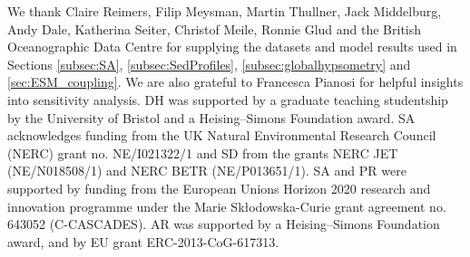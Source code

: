 \documentclass[gmd, manuscript]{copernicus}
\begin{document}




\begin{acknowledgements}
We thank Claire Reimers, Filip Meysman, Martin Thullner, Jack Middelburg, Andy Dale, Katherina Seiter, Christof Meile, Ronnie Glud and the British Oceanographic Data Centre for supplying the datasets and model results used in 
Sections \ref{subsec:SA}, \ref{subsec:SedProfiles},  \ref{subsec:globalhypsometry} and \ref{sec:ESM_coupling}. 
We are also grateful to Francesca Pianosi for helpful insights into sensitivity analysis. 
DH was supported by a graduate teaching studentship by the University of Bristol and a Heising–Simons Foundation award. SA acknowledges funding from the UK Natural Environmental Research Council (NERC) grant no. NE/I021322/1 and 
SD from the grants NERC JET (NE/N018508/1) and NERC BETR (NE/P013651/1). 
SA and PR were supported by funding from the European Unions Horizon 2020 research and innovation programme under the Marie Sk\l{}odowska-Curie grant agreement no. 643052 (C-CASCADES). 
AR was supported by a Heising–Simons Foundation award, and by EU grant ERC-2013-CoG-617313. 
\end{acknowledgements}
\end{document}
